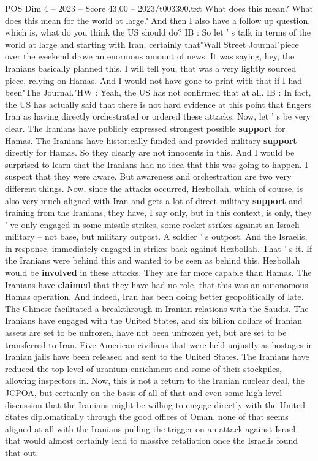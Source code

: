 \begin{textsample}{POS Dim 4 – 2023 – Score 43.00 – 2023/t003390.txt}
What does this mean?
What does this mean for the world at large?
And then I also have a follow up question, which is, what do you think the US should do?
IB : So let ' s talk in terms of the world at large and starting with Iran, certainly that"Wall Street Journal"piece over the weekend drove an enormous amount of news.
It was saying, hey, the Iranians basically planned this.
I will tell you, that was a very lightly sourced piece, relying on Hamas.
And I would not have gone to print with that if I had been"The Journal."HW : Yeah, the US has not confirmed that at all.
IB : In fact, the US has actually said that there is not hard evidence at this point that fingers Iran as having directly orchestrated or ordered these attacks.
Now, let ' s be very clear.
The Iranians have publicly expressed strongest possible \textbf{support} for Hamas.
The Iranians have historically funded and provided military \textbf{support} directly for Hamas.
So they clearly are not innocents in this.
And I would be surprised to learn that the Iranians had no idea that this was going to happen.
I suspect that they were aware.
But awareness and orchestration are two very different things.
Now, since the attacks occurred, Hezbollah, which of course, is also very much aligned with Iran and gets a lot of direct military \textbf{support} and training from the Iranians, they have, I say only, but in this context, is only, they ' ve only engaged in some missile strikes, some rocket strikes against an Israeli military -- not base, but military outpost.
A soldier ' s outpost.
And the Israelis, in response, immediately engaged in strikes back against Hezbollah.
That ' s it.
If the Iranians were behind this and wanted to be seen as behind this, Hezbollah would be \textbf{involved} in these attacks.
They are far more capable than Hamas.
The Iranians have \textbf{claimed} that they have had no role, that this was an autonomous Hamas operation.
And indeed, Iran has been doing better geopolitically of late.
The Chinese facilitated a breakthrough in Iranian relations with the Saudis.
The Iranians have engaged with the United States, and six billion dollars of Iranian assets are set to be unfrozen, have not been unfrozen yet, but are set to be transferred to Iran.
Five American civilians that were held unjustly as hostages in Iranian jails have been released and sent to the United States.
The Iranians have reduced the top level of uranium enrichment and some of their stockpiles, allowing inspectors in.
Now, this is not a return to the Iranian nuclear deal, the JCPOA, but certainly on the basis of all of that and even some high-level discussion that the Iranians might be willing to engage directly with the United States diplomatically through the good offices of Oman, none of that seems aligned at all with the Iranians pulling the trigger on an attack against Israel that would almost certainly lead to massive retaliation once the Israelis found that out.

\end{textsample}
